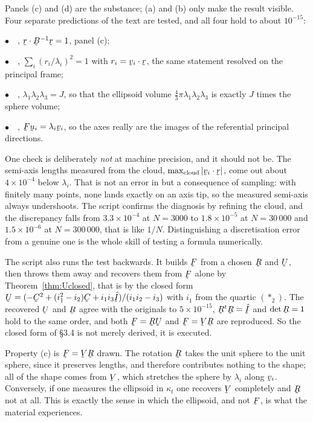 \begin{remark}\label{rem:numcheck}
Panels (c) and (d) are the substance; (a) and (b) only make the result
visible. Four separate predictions of the text are tested, and all four
hold to about $10^{-15}$:

$\bullet$\ \ , $\ip{\br}{\bB^{-1}\br}=1$, panel (c);

$\bullet$\ \ , $\sum_{i}(r_{i}/\lambda_{i})^{2}=1$ with
$r_{i}=\ip{\bv_{i}}{\br}$, the same statement resolved on the principal
frame;

$\bullet$\ \ , $\lambda_{1}\lambda_{2}\lambda_{3}=J$, so that the
ellipsoid volume $\tfrac43\pi\lambda_{1}\lambda_{2}\lambda_{3}$ is exactly
$J$ times the sphere volume;

$\bullet$\ \ , $\bF\bu_{i}=\lambda_{i}\bv_{i}$, so the axes really
are the images of the referential principal directions.

One check is deliberately \emph{not} at machine precision, and it should
not be. The semi-axis lengths measured from the cloud, $\max_{\text{cloud}}
|\ip{\bv_{i}}{\br}|$, come out about $4\times10^{-4}$ below $\lambda_{i}$.
That is not an error in  but a consequence of sampling: with
finitely many points, none lands exactly on an axis tip, so the measured
semi-axis always undershoots. The script confirms the diagnosis by
refining the cloud, and the discrepancy falls from $3.3\times10^{-4}$ at
$N=3000$ to $1.8\times10^{-5}$ at $N=30\,000$ and
$1.5\times10^{-6}$ at $N=300\,000$, that is like $1/N$.
Distinguishing a discretisation error from a genuine one is the whole
skill of testing a formula numerically.

The script also runs the test backwards. It builds $\bF$ from a chosen
$\bR$ and $\bU$, then throws them away and recovers them from $\bF$ alone
by Theorem~\ref{thm:Uclosed}, that is by the closed form
$\bU=(-\bC^{2}+(i_{1}^{2}-i_{2})\bC+i_{1}i_{3}\hI)/(i_{1}i_{2}-i_{3})$ with
$i_{1}$ from the quartic $(\ast_{2})$. The recovered $\bU$ and $\bR$ agree
with the originals to $5\times10^{-15}$, $\bR^{t}\bR=\hI$ and
$\det\bR=1$ hold to the same order, and both $\bF=\bR\bU$ and
$\bF=\bV\bR$ are reproduced. So the closed form of \S3.4 is not merely
derived, it is executed.
\end{remark}

\begin{remark}
\label{rem:ellipsoid}
Property (c) is $\bF=\bV\bR$ drawn. The rotation $\bR$ takes the unit
sphere to the unit sphere, since it preserves lengths, and therefore
contributes nothing to the shape; all of the shape comes from $\bV$, which
stretches the sphere by $\lambda_{i}$ along $\bv_{i}$. Conversely, if one
measures the ellipsoid in $\kappa_{t}$ one recovers $\bV$ completely and
$\bR$ not at all. This is exactly the sense in which the ellipsoid, and
not $\bF$, is what the material experiences.
\end{remark}

